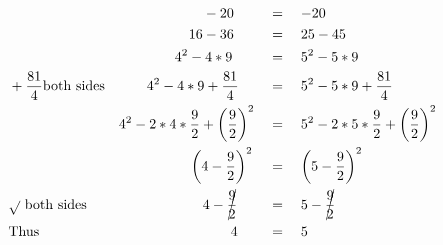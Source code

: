 \begin{alignat*}{3}
&\,&&\qquad\qquad\qquad-20&&=\quad-20\\
&\,&&\qquad\qquad\quad16-36&&=\quad25-45\\
&\,&&\qquad\qquad4^2-4*9&&=\quad5^2-5*9\\
&+\frac{81}{4}\mathrm{both~sides}&&\qquad4^2-4*9+\frac{81}{4}&&=\quad5^2-5*9+\frac{81}{4}\\
&\,&&4^2-2*4*\frac{9}{2}+\left(\frac{9}{2}\right)^2&&=\quad5^2-2*5*\frac{9}{2}+ \left(\frac{9}{2}\right)^2\\
&\,&&\qquad\qquad\quad\left(4-\frac{9}{2}\right)^2&&=\quad\left(5-\frac{9}{2}\right)^2\\
&\sqrt{}~\mathrm{both~sides}&&\qquad\qquad\qquad4-\cancel{\frac{9}{2}}&&=\quad5-\cancel{\frac{9}{2}}\\
&\mathrm{Thus}&&\qquad\qquad\qquad\qquad4&&=\quad5
\end{alignat*}
